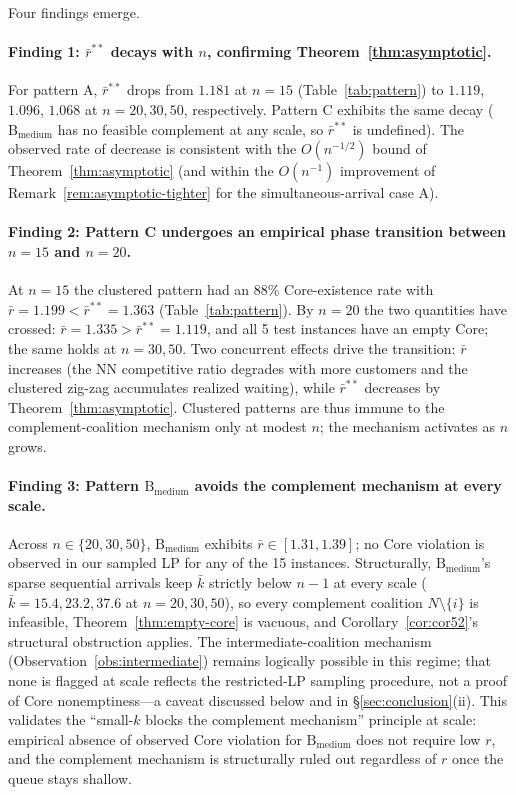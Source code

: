 \documentclass[11pt]{article}
\theoremstyle{plain}
\theoremstyle{definition}
\theoremstyle{remark}
\begin{document}
Four findings emerge.

\paragraph{Finding 1: $\bar r^{\ast\ast}$ decays with $n$, confirming Theorem~\ref{thm:asymptotic}.} For pattern A, $\bar r^{\ast\ast}$ drops from $1.181$ at $n=15$ (Table~\ref{tab:pattern}) to $1.119$, $1.096$, $1.068$ at $n=20, 30, 50$, respectively. Pattern C exhibits the same decay ($\text{B}_{\text{medium}}$ has no feasible complement at any scale, so $\bar r^{\ast\ast}$ is undefined). The observed rate of decrease is consistent with the $O(n^{-1/2})$ bound of Theorem~\ref{thm:asymptotic} (and within the $O(n^{-1})$ improvement of Remark~\ref{rem:asymptotic-tighter} for the simultaneous-arrival case A).

\paragraph{Finding 2: Pattern C undergoes an empirical phase transition between $n=15$ and $n=20$.} At $n=15$ the clustered pattern had an $88\%$ Core-existence rate with $\bar r = 1.199 < \bar r^{\ast\ast} = 1.363$ (Table~\ref{tab:pattern}). By $n=20$ the two quantities have crossed: $\bar r = 1.335 > \bar r^{\ast\ast} = 1.119$, and all 5 test instances have an empty Core; the same holds at $n=30, 50$. Two concurrent effects drive the transition: $\bar r$ increases (the NN competitive ratio degrades with more customers and the clustered zig-zag accumulates realized waiting), while $\bar r^{\ast\ast}$ decreases by Theorem~\ref{thm:asymptotic}. Clustered patterns are thus immune to the complement-coalition mechanism only at modest $n$; the mechanism activates as $n$ grows.

\paragraph{Finding 3: Pattern $\text{B}_{\text{medium}}$ avoids the complement mechanism at every scale.} Across $n\in\{20,30,50\}$, $\text{B}_{\text{medium}}$ exhibits $\bar r \in [1.31,1.39]$; no Core violation is observed in our sampled LP for any of the 15 instances. Structurally, $\text{B}_{\text{medium}}$'s sparse sequential arrivals keep $\bar k$ strictly below $n-1$ at every scale ($\bar k = 15.4, 23.2, 37.6$ at $n=20, 30, 50$), so every complement coalition $N\setminus\{i\}$ is infeasible, Theorem~\ref{thm:empty-core} is vacuous, and Corollary~\ref{cor:cor52}'s structural obstruction applies. The intermediate-coalition mechanism (Observation~\ref{obs:intermediate}) remains logically possible in this regime; that none is flagged at scale reflects the restricted-LP sampling procedure, not a proof of Core nonemptiness---a caveat discussed below and in \S\ref{sec:conclusion}(ii). This validates the ``small-$k$ blocks the complement mechanism'' principle at scale: empirical absence of observed Core violation for $\text{B}_{\text{medium}}$ does not require low $r$, and the complement mechanism is structurally ruled out regardless of $r$ once the queue stays shallow.
\end{document}
